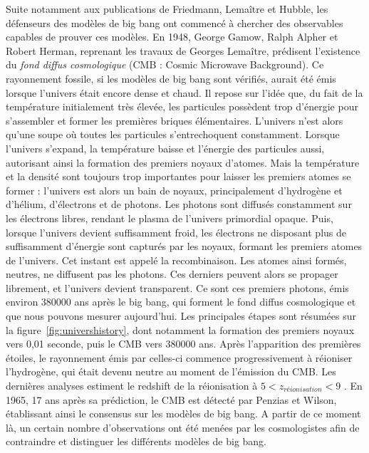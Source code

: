 \documentclass[11pt, twoside, a4paper, openright]{report}
\begin{document}
Suite notamment aux publications de Friedmann, Lemaître et Hubble, les défenseurs des modèles de big bang ont commencé à chercher des observables capables de prouver ces modèles. En 1948, George Gamow, Ralph Alpher et Robert Herman, reprenant les travaux de Georges Lemaître, prédisent l'existence du \emph{fond diffus cosmologique} (CMB : Cosmic Microwave Background). Ce rayonnement fossile, si les modèles de big bang sont vérifiés, aurait été émis lorsque l'univers était encore dense et chaud. Il repose sur l'idée que, du fait de la température initialement très élevée, les particules possèdent trop d'énergie pour s'assembler et former les premières briques élémentaires. L'univers n'est alors qu'une soupe où toutes les particules s'entrechoquent constamment. Lorsque l'univers s'expand, la température baisse et l'énergie des particules aussi, autorisant ainsi la formation des premiers noyaux d'atomes. Mais la température et la densité sont toujours trop importantes pour laisser les premiers atomes se former : l'univers est alors un bain de noyaux, principalement d'hydrogène et d'hélium, d'électrons et de photons. Les photons sont diffusés constamment sur les électrons libres, rendant le plasma de l'univers primordial opaque. Puis, lorsque l'univers devient suffisamment froid, les électrons ne disposant plus de suffisamment d'énergie sont capturés par les noyaux, formant les premiers atomes de l'univers. Cet instant est appelé la recombinaison. Les atomes ainsi formés, neutres, ne diffusent pas les photons. Ces derniers peuvent alors se propager librement, et l'univers devient transparent. Ce sont ces premiers photons, émis environ \num{380000} ans après le big bang, qui forment le fond diffus cosmologique et que nous pouvons mesurer aujourd'hui. Les principales étapes sont résumées sur la figure~\ref{fig:univershistory}, dont notamment la formation des premiers noyaux vers 0,01 seconde, puis le CMB vers \num{380000} ans.
Après l'apparition des premières étoiles, le rayonnement émis par celles-ci commence progressivement à réioniser l'hydrogène, qui était devenu neutre au moment de l'émission du CMB. Les dernières analyses estiment le redshift de la réionisation à $5 < z_{réionisation} < 9$ \autocite{Collaboration2018}.
En 1965, 17 ans après sa prédiction, le CMB est détecté par Penzias et Wilson, établissant ainsi le consensus sur les modèles de big bang. A partir de ce moment là, un certain nombre d'observations ont été menées par les cosmologistes afin de contraindre et distinguer les différents modèles de big bang.
\end{document}
